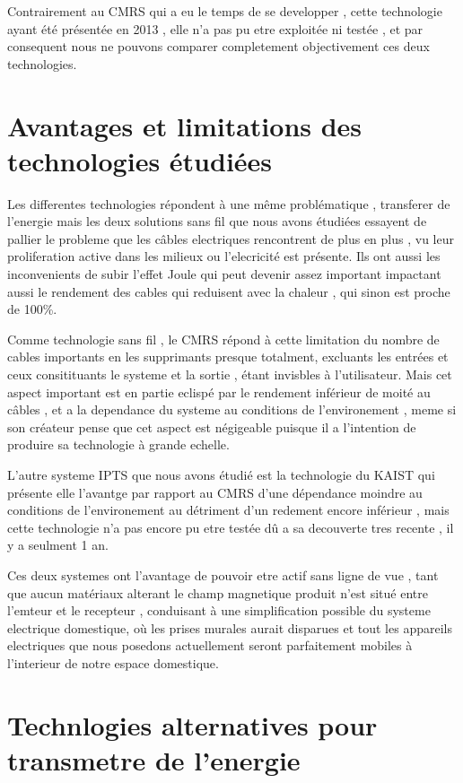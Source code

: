 \documentclass[12pt]{report}
\begin{document}
  Contrairement au CMRS qui a eu le temps de se developper , cette technologie ayant été présentée en 2013 , elle n'a pas pu etre exploitée ni testée , et par consequent nous ne pouvons comparer completement objectivement ces deux technologies.
\section{Avantages et limitations des technologies étudiées}
Les differentes technologies répondent à une même problématique , transferer de l'energie mais les deux solutions sans fil que nous avons étudiées essayent de pallier le probleme que les câbles electriques rencontrent de plus en plus , vu leur proliferation active dans les milieux ou l'elecricité est présente. Ils ont aussi les inconvenients de subir l'effet Joule qui peut devenir assez important impactant aussi le rendement des cables qui reduisent avec la chaleur , qui sinon est proche de 100\%.

  Comme technologie sans fil , le CMRS répond à cette limitation du nombre de cables importants en les supprimants presque totalment, excluants les entrées et ceux consitituants le systeme et la sortie , étant invisbles à l'utilisateur. Mais cet aspect important est en partie eclispé par le rendement inférieur de moité au câbles , et a la dependance du systeme au conditions de l'environement , meme si son créateur pense que cet aspect est négigeable puisque il a l'intention de produire sa technologie à grande echelle.
  
  L'autre systeme IPTS que nous avons étudié est la technologie du KAIST qui présente elle l'avantge par rapport au CMRS d'une dépendance moindre au conditions de l'environement au détriment d'un redement encore inférieur , mais cette technologie n'a pas encore pu etre testée dû a sa decouverte tres recente , il y a seulment 1 an.
  
  Ces deux systemes ont l'avantage de pouvoir etre actif sans ligne de vue , tant que aucun matériaux alterant le champ magnetique produit n'est situé entre l'emteur et le recepteur , conduisant à une simplification possible du systeme electrique domestique, où les prises murales aurait disparues et tout les appareils electriques que nous posedons actuellement seront parfaitement mobiles à l'interieur de notre espace domestique.
\section{Technlogies alternatives pour transmetre de l'energie \cite{wiki5}}
\end{document}
